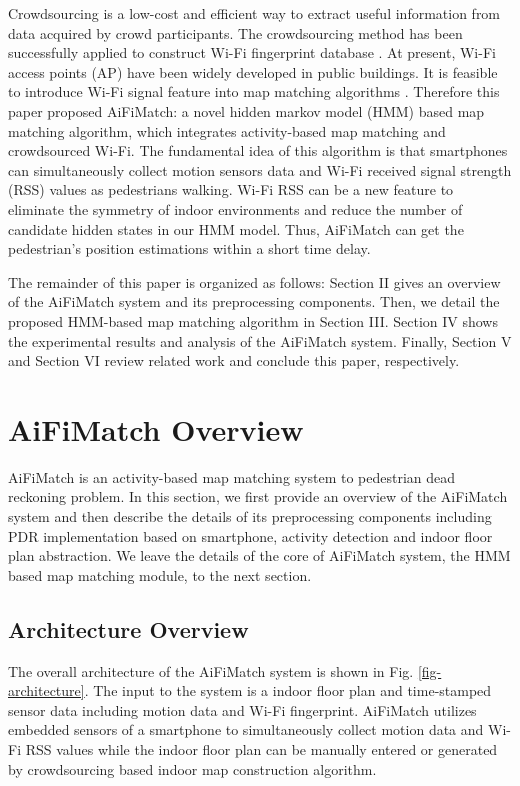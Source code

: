\documentclass{llncs}
\begin{document}
Crowdsourcing is a low-cost and efficient way to extract useful information from data acquired by crowd participants. The crowdsourcing method has been successfully applied to construct Wi-Fi fingerprint database \cite{zhang2014robust}. At present, Wi-Fi access points (AP) have been widely developed in public buildings. It is feasible to introduce Wi-Fi signal feature into map matching algorithms \cite{seitz2010hidden}. Therefore this paper proposed AiFiMatch: a novel hidden markov model (HMM) based map matching algorithm, which integrates activity-based map matching and crowdsourced Wi-Fi. The fundamental idea of this algorithm is that smartphones can simultaneously collect motion sensors data and Wi-Fi received signal strength (RSS) values as pedestrians walking. Wi-Fi RSS can be a new feature to eliminate the symmetry of indoor environments and reduce the number of candidate hidden states in our HMM model. Thus, AiFiMatch can get the pedestrian's position estimations within a short time delay. 

The remainder of this paper is organized as follows: Section II gives an overview of the AiFiMatch system and its preprocessing components. Then, we detail the proposed HMM-based map matching algorithm in Section III. Section IV shows the experimental results and analysis of the AiFiMatch system. Finally, Section V and Section VI review related work and conclude this paper, respectively.

\section{AiFiMatch Overview}

AiFiMatch is an activity-based map matching system to pedestrian dead reckoning problem. In this section, we first provide an overview of the AiFiMatch system and then describe the details of its preprocessing components including PDR implementation based on smartphone, activity detection and indoor floor plan abstraction. We leave the details of the core of AiFiMatch system, the HMM based map matching module, to the next section.

\subsection{Architecture Overview}

The overall architecture of the AiFiMatch system is shown in Fig. \ref{fig-architecture}. The input to the system is a indoor floor plan and time-stamped sensor data including motion data and Wi-Fi fingerprint. AiFiMatch utilizes embedded sensors of a smartphone to simultaneously collect motion data and Wi-Fi RSS values while the indoor floor plan can be manually entered or generated by crowdsourcing based indoor map construction algorithm.
\end{document}
